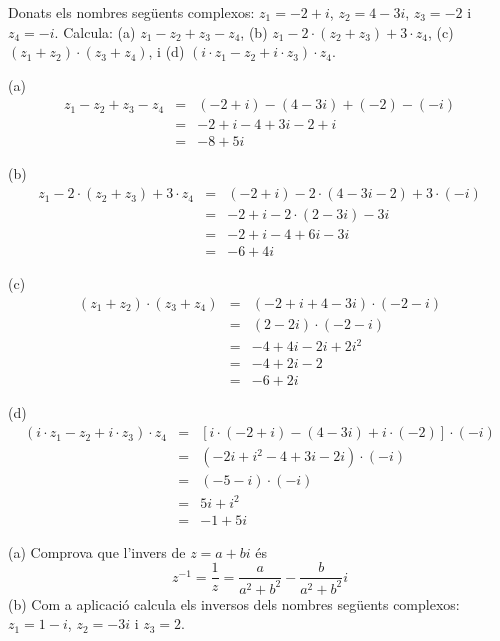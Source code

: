 \begin{exemple}
Donats els nombres següents complexos: $z_{1}=-2+i$, $z_{2}=4-3i$, $
z_{3}=-2$ i $z_{4}=-i$. Calcula: (a) $z_{1}-z_{2}+z_{3}-z_{4}$, (b) $
z_{1}-2\cdot (z_{2}+z_{3})+3\cdot z_{4}$, (c) $(z_{1}+z_{2})\cdot
(z_{3}+z_{4})$, i (d) $(i\cdot z_{1}-z_{2}+i\cdot z_{3})\cdot z_{4}$.
\end{exemple}

\begin{solucio}
(a)
\begin{eqnarray*}
z_{1}-z_{2}+z_{3}-z_{4} &=&(-2+i)-(4-3i)+(-2)-(-i) \\
&=&-2+i-4+3i-2+i \\
&=&-8+5i
\end{eqnarray*}

(b)
\begin{eqnarray*}
z_{1}-2\cdot (z_{2}+z_{3})+3\cdot z_{4} &=&(-2+i)-2\cdot \left(
4-3i-2\right) +3\cdot (-i) \\
&=&-2+i-2\cdot (2-3i)-3i \\
&=&-2+i-4+6i-3i \\
&=&-6+4i
\end{eqnarray*}

(c)
\begin{eqnarray*}
(z_{1}+z_{2})\cdot (z_{3}+z_{4}) &=&(-2+i+4-3i)\cdot (-2-i) \\
&=&(2-2i)\cdot (-2-i) \\
&=&-4+4i-2i+2i^{2} \\
&=&-4+2i-2 \\
&=&-6+2i
\end{eqnarray*}

(d)
\begin{eqnarray*}
(i\cdot z_{1}-z_{2}+i\cdot z_{3})\cdot z_{4} &=&\left[ i\cdot
(-2+i)-(4-3i)+i\cdot (-2)\right] \cdot (-i) \\
&=&(-2i+i^{2}-4+3i-2i)\cdot (-i) \\
&=&(-5-i)\cdot (-i) \\
&=&5i+i^{2} \\
&=&-1+5i
\end{eqnarray*}
\end{solucio}

\begin{exemple}
(a) Comprova que l’invers de $z=a+bi$ és
\begin{equation*}
z^{-1}=\frac{1}{z}=\frac{a}{a^{2}+b^{2}}-\frac{b}{a^{2}+b^{2}}i
\end{equation*}
(b) Com a aplicació calcula els inversos dels nombres següents
complexos: $z_{1}=1-i$, $z_{2}=-3i$ i $z_{3}=2$.
\end{exemple}

